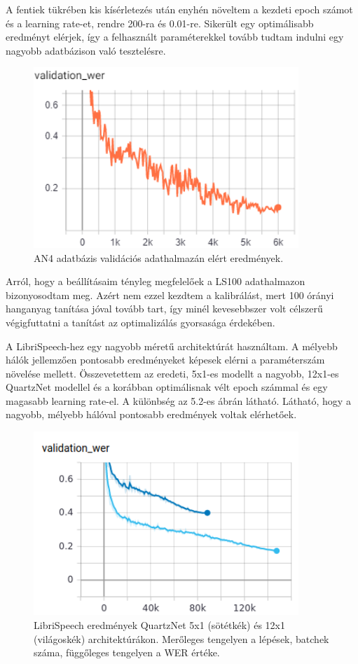 A fentiek tükrében kis kísérletezés után enyhén növeltem a kezdeti epoch számot és a learning rate-et, rendre 200-ra és 0.01-re. Sikerült egy optimálisabb eredményt elérjek, így a felhasznált paraméterekkel tovább tudtam indulni egy nagyobb adatbázison való tesztelésre.

\begin{figure}[!ht]
\centering
\includegraphics[width=100mm, keepaspectratio]{figures/an4_wer.png}
\caption{AN4 adatbázis validációs adathalmazán elért eredmények.}
\end{figure}

Arról, hogy a beállításaim tényleg megfelelőek a LS100 adathalmazon bizonyosodtam meg. Azért nem ezzel kezdtem a kalibrálást, mert 100 órányi hanganyag tanítása jóval tovább tart, így minél kevesebbszer volt célszerű végigfuttatni a tanítást az optimalizálás gyorsasága érdekében.

A LibriSpeech-hez egy nagyobb méretű architektúrát használtam. A mélyebb hálók jellemzően pontosabb eredményeket képesek elérni a paraméterszám növelése mellett. Összevetettem az eredeti, 5x1-es modellt a nagyobb, 12x1-es QuartzNet modellel és a korábban optimálisnak vélt epoch számmal és egy magasabb learning rate-el. A különbség az 5.2-es ábrán látható. Látható, hogy a nagyobb, mélyebb hálóval pontosabb eredmények voltak elérhetőek.

\begin{figure}[!ht]
\centering
\includegraphics[width=100mm, keepaspectratio]{figures/architecture_comparrison.png}
\caption{LibriSpeech eredmények QuartzNet 5x1 (sötétkék) és 12x1 (világoskék) architektúrákon. Merőleges tengelyen a lépések, batchek száma, függőleges tengelyen a WER értéke.}
\end{figure}

